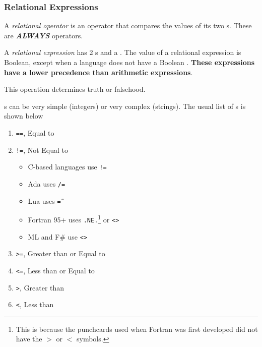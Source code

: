 \subsubsection{Relational Expressions}\label{subsubsec:Relational_Expressions}
\begin{definition}\label{def:Relational_Operator}
  A \emph{relational operator} is an operator that compares the values of its two s.
  These are \textbf{\emph{ALWAYS}}  operators.
\end{definition}

\begin{definition}\label{def:Relational_Expression}
  A \emph{relational expression} has 2 s and a .
  The value of a relational expression is Boolean, except when a language does not have a Boolean .
  \textbf{These expressions have a lower precedence than arithmetic expressions}.

  This operation determines truth or falsehood.
\end{definition}

s can be very simple (integers) or very complex (strings).
The usual list of s is shown below
\begin{enumerate}[noitemsep]
\item \texttt{==}, Equal to
\item \texttt{!=}, Not Equal to
  \begin{itemize}[noitemsep]
  \item C-based languages use \texttt{!=}
  \item Ada uses \texttt{/=}
  \item Lua uses \texttt{\~=}
  \item Fortran 95+ uses \texttt{.NE.}\footnote{This is because the punchcards used when Fortran was first developed did not have the $>$ or $<$ symbols.} or \texttt{<>}
  \item ML and F\# use \texttt{<>}
  \end{itemize}
\item \texttt{>=}, Greater than or Equal to
\item \texttt{<=}, Less than or Equal to
\item \texttt{>}, Greater than
\item \texttt{<}, Less than
\end{enumerate}

